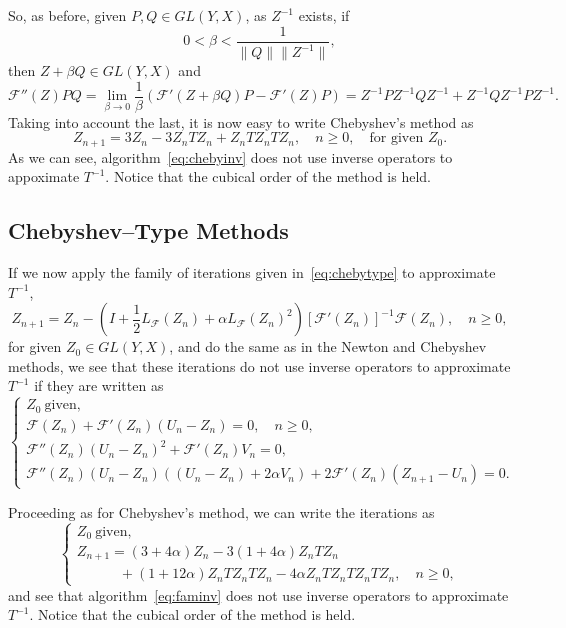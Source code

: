 \documentclass[11pt,twoside,letterpaper]{article} %
\begin{document}
So, as before, given $P,Q\in GL(Y,X)$, as $Z^{-1}$ exists, if
$$
0 < \beta < \dfrac{1}{\|{Q}\|\|Z^{-1}\|},
$$
then $Z+\beta{Q}\in GL(Y,X)$ and
$$
\mathcal{F}''(Z){P}{Q}=
\lim_{\beta\rightarrow 0}\frac{1}{\beta}
\left(\mathcal{F}'(Z+\beta{Q}){P}-\mathcal{F}'(Z){P}\right)
= Z^{-1}{P} Z^{-1}{Q} Z^{-1} + Z^{-1}{Q} Z^{-1}{P} Z^{-1}.
$$
Taking into account the last, it is now easy to write Chebyshev's method as
\begin{equation}
\label{eq:chebyinv}
Z_{n+1} = 3Z_n-3Z_nTZ_n+Z_nTZ_nTZ_n,\quad n\geq 0,
\quad\mbox{for given } Z_0.
\end{equation}
As we can see, algorithm~\eqref{eq:chebyinv} does not use inverse operators to appoximate $T^{-1}$. Notice that the cubical order of the method is held.

\subsection{Chebyshev--Type Methods}

If we now apply the family of iterations given in~\eqref{eq:chebytype} to approximate $T^{-1}$,
\begin{equation*}
Z_{n+1} = Z_n-\left(I+\frac{1}{2}L_{\mathcal{F}}(Z_n)+\alpha L_{\mathcal{F}}(Z_n)^2\right)[\mathcal{F}'(Z_n)]^{-1}\mathcal{F}(Z_n),\quad n\geq 0,
\end{equation*}
for given $Z_0\in GL(Y,X)$, and do the same as in the Newton and Chebyshev methods, we see that these iterations do not use inverse operators to approximate $T^{-1}$ if they are written as
$$
\left\{
\begin{array}{l}
Z_0\ \text{given}, \\[1ex]
\mathcal{F}(Z_n)+\mathcal{F}'(Z_n)(U_n-Z_n)=0,\quad n\geq 0,\\[1ex]
\mathcal{F}''(Z_n)(U_n-Z_n)^2+\mathcal{F}'(Z_n)V_n=0,\\[1ex]
\mathcal{F}''(Z_n)(U_n-Z_n)
\left((U_n-Z_n)+2\alpha V_n\right)
+2\mathcal{F}'(Z_n)(Z_{n+1}-U_n)=0.
\end{array}
\right.
$$

Proceeding as for Chebyshev's method, we can write the iterations as
\begin{equation}
\label{eq:faminv}
\left\{
\begin{array}{l}
Z_0\ \text{given}, \\[1ex]
Z_{n+1} = (3+4\alpha)Z_n-3(1+4\alpha)Z_nTZ_n \\[1ex]
\qquad\quad +(1+12\alpha)Z_nTZ_nTZ_n-4\alpha Z_nTZ_nTZ_nTZ_n,\quad n\geq 0,
\end{array}
\right.
\end{equation}
and see that algorithm~\eqref{eq:faminv} does not use inverse operators to approximate $T^{-1}$. Notice that the cubical order of the method is held.
\end{document}
